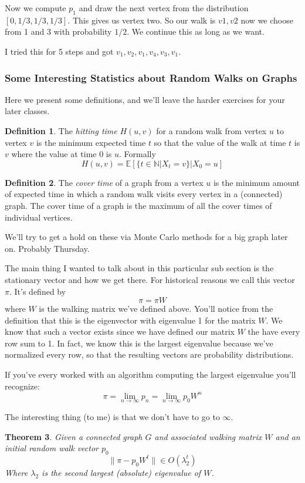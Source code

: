 \documentclass{article}
\newtheorem{thm}{Theorem}
\theoremstyle{definition}
\newtheorem{defn}[thm]{Definition}
\theoremstyle{remark}
\begin{document}
Now we compute $p_1$ and draw the next vertex from the distribution $[0, 1/3, 1/3, 1/3]$.
This gives us vertex two.  So our walk is $v1,v2$ now we choose from 1 and 3 with probability $1/2$. We continue this as long as we want.

I tried this for 5 steps and got $v_1,v_2,v_1,v_4,v_3,v_1$.

\subsubsection{Some Interesting Statistics about Random Walks on Graphs}

Here we present some definitions, and we'll leave the harder exercises for your later classes.
\begin{defn}
	The \emph{hitting time} $H(u,v)$ for a random walk from vertex $u$ to vertex $v$ is the minimum expected time $t$ so that the value of the walk at time $t$ is $v$ where the value at time $0$ is $u$. Formally
	\[
	H(u,v) = \mathbb{E}\left[\{t\in \mathbb{N}| X_t=v\} | X_0 = u\right]
	\]
\end{defn}

\begin{defn}
	The \emph{cover time} of a graph from a vertex $u$ is the minimum amount of expected time in which a random walk visits every vertex in a (connected) graph.  The cover time of a graph is the maximum of all the cover times of individual vertices.
\end{defn}

We'll try to get a hold on these via Monte Carlo methods for a big graph later on. Probably Thursday.

The main thing I wanted to talk about in this particular sub section is the stationary vector and how we get there.
For historical reasons we call this vector $\pi$.  It's defined by
\[
\pi = \pi W
\]
where $W$ is the walking matrix we've defined above.  You'll notice from the definition that this is the eigenvector with eigenvalue 1 for the matrix $W$.  We know that such a vector exists since we have defined our matrix $W$ the have every row sum to 1.  In fact, we know this is the largest eigenvalue because we've normalized every row, so that the resulting vectors are probability distributions.

If you've every worked with an algorithm computing the largest eigenvalue you'll recognize:
\[
\pi = \lim_{n\rightarrow \infty} p_n = \lim_{n\rightarrow \infty} p_0 W^n
\]

The interesting thing (to me) is that we don't have to go to $\infty$.  
\begin{thm}
	Given a connected graph $G$ and associated walking matrix $W$ and an initial random walk vector $p_0$ 
	\[
	\| \pi - p_0 W^t\| \in O(\lambda_2^t)
	\]
	Where $\lambda_2$ is the second largest (absolute) eigenvalue of $W$.  
	
\end{thm}
\end{document}
